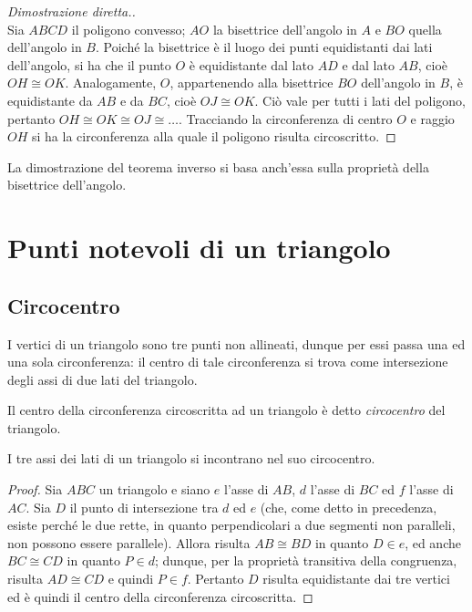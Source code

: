 \noindent\begin{minipage}{0.6\textwidth}\parindent15pt
\begin{proof}[Dimostrazione diretta.]~\\
Sia $ABCD$ il poligono convesso; $AO$ la bisettrice dell'angolo in $A$ e $BO$ quella dell'angolo in $B$. Poiché la bisettrice è il luogo dei punti equidistanti dai lati dell'angolo, si ha che il punto $O$ è equidistante dal lato $AD$ e dal lato $AB$, cioè $OH\cong OK$. Analogamente, $O$, appartenendo alla bisettrice $BO$ dell'angolo in $B$, è equidistante da $AB$ e da $BC$, cioè $OJ\cong OK$. Ciò vale per tutti i lati del poligono, pertanto $OH\cong OK\cong OJ\cong \ldots$. Tracciando la circonferenza di centro $O$ e raggio $OH$ si ha la circonferenza alla quale il poligono risulta circoscritto.
\end{proof}
\end{minipage}\hfil
\noindent\begin{minipage}{0.4\textwidth}
	\centering
\end{minipage}

La dimostrazione del teorema inverso si basa anch'essa sulla proprietà della bisettrice dell'angolo.


\section{Punti notevoli di un triangolo}

\subsection{Circocentro}

I vertici di un triangolo sono tre punti non allineati, dunque per essi passa una ed una sola circonferenza: il centro di tale circonferenza si trova come intersezione degli assi di due lati del triangolo.

\begin{definizione}
Il centro della circonferenza circoscritta ad un triangolo è detto \emph{circocentro} del triangolo.
\end{definizione}

\begin{teorema}
I tre assi dei lati di un triangolo si incontrano nel suo circocentro.
\end{teorema}

\begin{figure}[htb]
	\centering
\end{figure}
\begin{proof}
Sia $ABC$ un triangolo e siano $e$ l'asse di $AB$, $d$ l'asse di $BC$ ed $f$ l'asse di $AC$. Sia $D$ il punto di intersezione tra $d$ ed $e$ (che, come detto in precedenza, esiste perché le due rette, in quanto perpendicolari a due segmenti non paralleli, non possono essere parallele). Allora risulta $AB\cong BD$ in quanto $D\in e$, ed anche $BC\cong CD$ in quanto $P\in d$; dunque, per la proprietà transitiva della congruenza, risulta $AD\cong CD$ e quindi $P\in f$. Pertanto $D$ risulta equidistante dai tre vertici ed è quindi il centro della circonferenza circoscritta.
\end{proof}

